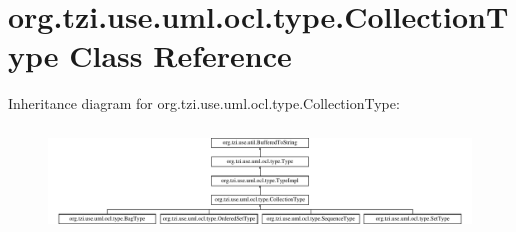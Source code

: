 \hypertarget{classorg_1_1tzi_1_1use_1_1uml_1_1ocl_1_1type_1_1_collection_type}{\section{org.\-tzi.\-use.\-uml.\-ocl.\-type.\-Collection\-Type Class Reference}
\label{classorg_1_1tzi_1_1use_1_1uml_1_1ocl_1_1type_1_1_collection_type}
}
Inheritance diagram for org.\-tzi.\-use.\-uml.\-ocl.\-type.\-Collection\-Type\-:\begin{figure}[H]
\begin{center}
\leavevmode
\includegraphics[height=2.811245cm]{classorg_1_1tzi_1_1use_1_1uml_1_1ocl_1_1type_1_1_collection_type}
\end{center}
\end{figure}
